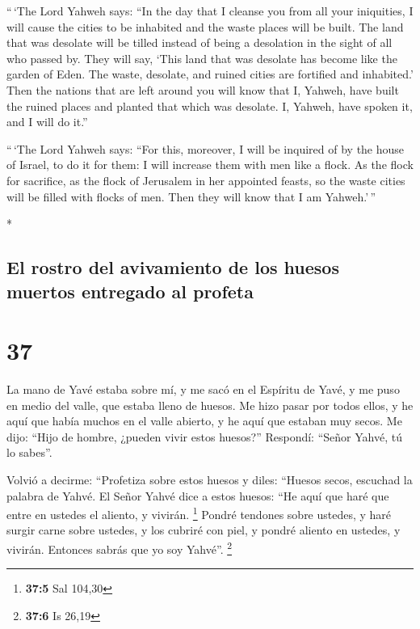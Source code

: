 \begin{paracol}{2}
\begin{otherlanguage}{english}
 ``\,`The Lord Yahweh says: ``In the day that I cleanse
you from all your iniquities, I will cause the cities to be inhabited
and the waste places will be built.  The land that was
desolate will be tilled instead of being a desolation in the sight of
all who passed by.  They will say, `This land that was
desolate has become like the garden of Eden. The waste, desolate, and
ruined cities are fortified and inhabited.'  Then the
nations that are left around you will know that I, Yahweh, have built
the ruined places and planted that which was desolate. I, Yahweh, have
spoken it, and I will do it.''

 ``\,`The Lord Yahweh says: ``For this, moreover, I will
be inquired of by the house of Israel, to do it for them: I will
increase them with men like a flock.  As the flock for
sacrifice, as the flock of Jerusalem in her appointed feasts, so the
waste cities will be filled with flocks of men. Then they will know that
I am Yahweh.'\,''

\end{otherlanguage}

\switchcolumn[0]*

\hypertarget{el-rostro-del-avivamiento-de-los-huesos-muertos-entregado-al-profeta}{%
\subsection{El rostro del avivamiento de los huesos muertos entregado al
profeta}\label{el-rostro-del-avivamiento-de-los-huesos-muertos-entregado-al-profeta}}

\hypertarget{section-72}{%
\section{37}\label{section-72}}

 La mano de Yavé estaba sobre mí, y me sacó en el Espíritu
de Yavé, y me puso en medio del valle, que estaba lleno de huesos.
 Me hizo pasar por todos ellos, y he aquí que había muchos
en el valle abierto, y he aquí que estaban muy secos.  Me
dijo: ``Hijo de hombre, ¿pueden vivir estos huesos?'' Respondí: ``Señor
Yahvé, tú lo sabes''.

 Volvió a decirme: ``Profetiza sobre estos huesos y diles:
``Huesos secos, escuchad la palabra de Yahvé.  El Señor
Yahvé dice a estos huesos: ``He aquí que haré que entre en ustedes el
aliento, y vivirán. \footnote{\textbf{37:5} Sal 104,30} 
Pondré tendones sobre ustedes, y haré surgir carne sobre ustedes, y los
cubriré con piel, y pondré aliento en ustedes, y vivirán. Entonces
sabrás que yo soy Yahvé''. \footnote{\textbf{37:6} Is 26,19}


\end{paracol}

